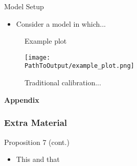 \begin{frame}{Model Setup}
\begin{itemize}
\item Consider a model in which...
\end{itemize}
\label{slide:state-space-framework}
\hyperlink{slide:stylized_facts}{}
\end{frame}

\begin{frame}

\begin{figure}
\centering
\caption{Example plot}
  \centering
  \texttt{[image: \\PathToOutput/example\_plot.png]}
\caption*{
  Traditional calibration...
  }
\label{fig:div-futures-habits-comparison}
\end{figure}

\end{frame}


\appendix
\begin{frame}
  \centering
  \textbf{Appendix}
\end{frame}

\begin{frame}
  \frametitle{Extra Material}
  \label{slide:prop7}
\alert{Proposition 7 (cont.)}
\begin{itemize}
\item This and that
\end{itemize}
\end{frame}


%   







